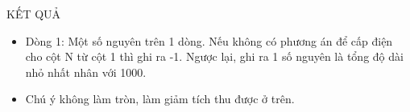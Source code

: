 KẾT QUẢ  
\begin{itemize}
	\item     Dòng 1: Một số nguyên trên 1 dòng. Nếu không có phương án để cấp điện cho cột N từ          cột 1 thì ghi ra -1. Ngược lại, ghi ra 1 số nguyên là tổng độ dài nhỏ nhất nhân với 1000.   
	\item     Chú ý không làm tròn, làm giảm tích thu được ở trên.   
\end{itemize}